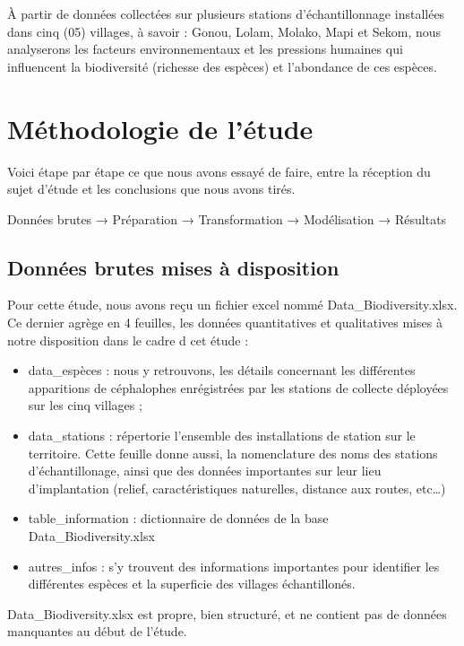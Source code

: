 \documentclass[
]{book}
\providecommand{\tightlist}{%
  \setlength{\itemsep}{0pt}\setlength{\parskip}{0pt}}
\begin{document}
À partir de données collectées sur plusieurs stations d'échantillonnage installées dans cinq (05) villages, à savoir : Gonou, Lolam, Molako, Mapi et Sekom, nous analyserons les facteurs environnementaux et les pressions humaines qui influencent la biodiversité (richesse des espèces) et l'abondance de ces espèces.

\chapter{Méthodologie de l'étude}\label{muxe9thodologie-de-luxe9tude}

Voici étape par étape ce que nous avons essayé de faire, entre la réception du sujet d'étude et les conclusions que nous avons tirés.

Données brutes → Préparation → Transformation → Modélisation → Résultats

\section{Données brutes mises à disposition}\label{donnuxe9es-brutes-mises-uxe0-disposition}

Pour cette étude, nous avons reçu un fichier excel nommé Data\_Biodiversity.xlsx. Ce dernier agrège en 4 feuilles, les données quantitatives et qualitatives mises à notre disposition dans le cadre d cet étude :

\begin{itemize}
\tightlist
\item
  data\_espèces : nous y retrouvons, les détails concernant les différentes apparitions de céphalophes enrégistrées par les stations de collecte déployées sur les cinq villages ;
\item
  data\_stations : répertorie l'ensemble des installations de station sur le territoire. Cette feuille donne aussi, la nomenclature des noms des stations d'échantillonage, ainsi que des données importantes sur leur lieu d'implantation (relief, caractéristiques naturelles, distance aux routes, etc\ldots)
\item
  table\_information : dictionnaire de données de la base Data\_Biodiversity.xlsx
\item
  autres\_infos : s'y trouvent des informations importantes pour identifier les différentes espèces et la superficie des villages échantillonés.
\end{itemize}

Data\_Biodiversity.xlsx est propre, bien structuré, et ne contient pas de données manquantes au début de l'étude.
\end{document}
